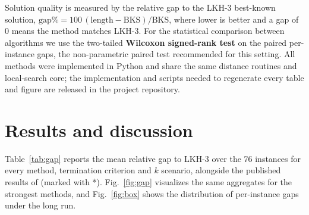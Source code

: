 \documentclass[sn-chicago]{sn-jnl}
\begin{document}
Solution quality is measured by the relative gap to the LKH-3 best-known solution,
$\mathrm{gap}\% = 100\,(\text{length}-\text{BKS})/\text{BKS}$, where lower is
better and a gap of $0$ means the method matches LKH-3. For the statistical
comparison between algorithms we use the two-tailed \textbf{Wilcoxon signed-rank
test} \citep{knox1994} on the paired per-instance gaps, the non-parametric paired
test recommended for this setting. All methods were implemented in Python and share
the same distance routines and local-search core; the implementation and scripts
needed to regenerate every table and figure are released in the project repository.

\section{Results and discussion}\label{sec:results}

Table~\ref{tab:gap} reports the mean relative gap to LKH-3 over the 76 instances
for every method, termination criterion and $k$ scenario, alongside the published
results of \citet{pandiri2020} (marked with *). Fig.~\ref{fig:gap} visualizes the
same aggregates for the strongest methods, and Fig.~\ref{fig:box} shows the
distribution of per-instance gaps under the long run.
\end{document}
